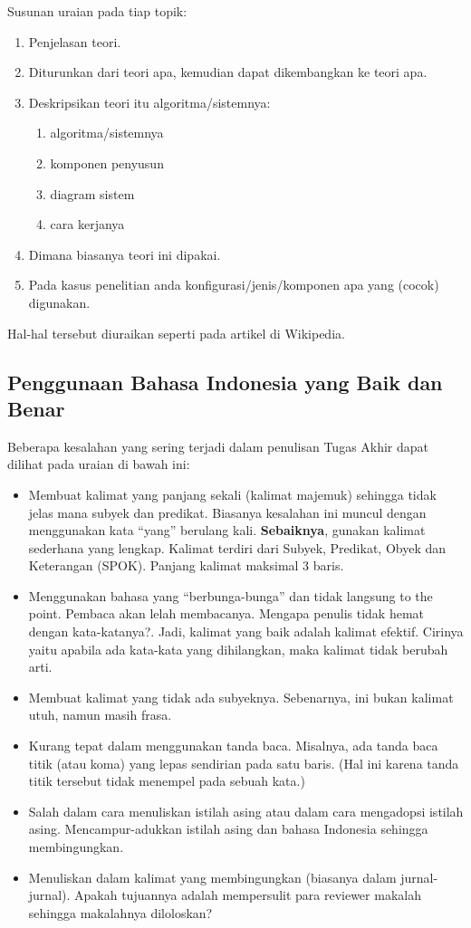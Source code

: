 \documentclass{thesis}
\begin{document}
Susunan uraian pada tiap topik:
\begin{enumerate}
    \item Penjelasan teori.
    \item Diturunkan dari teori apa, kemudian dapat dikembangkan ke teori apa.
    \item Deskripsikan teori itu algoritma/sistemnya:
    \begin{enumerate}
        \item algoritma/sistemnya 
        \item komponen penyusun
        \item diagram sistem
        \item cara kerjanya
    \end{enumerate}
    \item Dimana biasanya teori ini dipakai.
    \item Pada kasus penelitian anda konfigurasi/jenis/komponen apa yang (cocok) digunakan.
\end{enumerate}

Hal-hal tersebut diuraikan seperti pada artikel di Wikipedia.
    
\subsection{Penggunaan Bahasa Indonesia yang Baik dan Benar}

Beberapa kesalahan yang sering terjadi dalam penulisan Tugas Akhir dapat dilihat pada uraian di bawah ini:
\begin{itemize}
    \item Membuat kalimat yang panjang sekali (kalimat majemuk) sehingga tidak jelas mana subyek dan predikat. Biasanya kesalahan ini muncul dengan menggunakan kata “yang” berulang kali. \textbf{Sebaiknya}, gunakan kalimat sederhana yang lengkap. Kalimat terdiri dari Subyek, Predikat, Obyek dan Keterangan (SPOK). Panjang kalimat maksimal 3 baris.
    \item Menggunakan bahasa yang “berbunga-bunga” dan tidak langsung to the point. Pembaca akan lelah membacanya. Mengapa penulis tidak hemat dengan kata-katanya?. Jadi, kalimat yang baik adalah kalimat efektif. Cirinya yaitu apabila ada kata-kata yang dihilangkan, maka kalimat tidak berubah arti. 
    \item Membuat kalimat yang tidak ada subyeknya. Sebenarnya, ini bukan kalimat utuh, namun masih frasa.
    \item Kurang tepat dalam menggunakan tanda baca. Misalnya, ada tanda baca titik (atau koma) yang lepas sendirian pada satu baris. (Hal ini karena tanda titik tersebut tidak menempel pada sebuah kata.) 
    \item Salah dalam cara menuliskan istilah asing atau dalam cara mengadopsi istilah asing. Mencampur-adukkan istilah asing dan bahasa Indonesia sehingga membingungkan. 
    \item Menuliskan dalam kalimat yang membingungkan (biasanya dalam jurnal-jurnal). Apakah tujuannya adalah mempersulit para reviewer makalah sehingga makalahnya diloloskan? 
\end{itemize}
\end{document}
